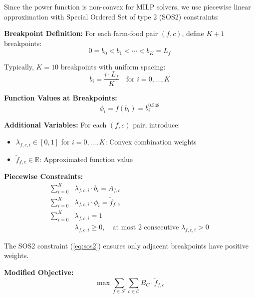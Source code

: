 \documentclass{article}
\begin{document}
Since the power function is non-convex for MILP solvers, we use piecewise linear approximation with Special Ordered Set of type 2 (SOS2) constraints:

\textbf{Breakpoint Definition:}
For each farm-food pair $(f,c)$, define $K+1$ breakpoints:
\begin{equation}
0 = b_0 < b_1 < \cdots < b_K = L_f
\end{equation}

Typically, $K = 10$ breakpoints with uniform spacing:
\begin{equation}
b_i = \frac{i \cdot L_f}{K} \quad \text{for } i = 0, \ldots, K
\end{equation}

\textbf{Function Values at Breakpoints:}
\begin{equation}
\phi_i = f(b_i) = b_i^{0.548}
\end{equation}

\textbf{Additional Variables:}
For each $(f,c)$ pair, introduce:
\begin{itemize}
    \item $\lambda_{f,c,i} \in [0,1]$ for $i = 0,\ldots,K$: Convex combination weights
    \item $\tilde{f}_{f,c} \in \mathbb{R}$: Approximated function value
\end{itemize}

\textbf{Piecewise Constraints:}
\begin{align}
 \sum_{i=0}^{K} &\lambda_{f,c,i} \cdot b_i =A_{f,c}\label{eq:pw_area}\\
 \sum_{i=0}^{K} &\lambda_{f,c,i} \cdot \phi_i =\tilde{f}_{f,c}\label{eq:pw_func}\\
\sum_{i=0}^{K} &\lambda_{f,c,i} = 1 \label{eq:pw_convex}\\
&\lambda_{f,c,i} \geq 0, \quad \text{at most 2 consecutive } \lambda_{f,c,i} > 0 \label{eq:sos2}
\end{align}

The SOS2 constraint (\ref{eq:sos2}) ensures only adjacent breakpoints have positive weights.


\textbf{Modified Objective:}
\begin{equation}
\max \sum_{f \in \mathcal{F}} \sum_{c \in \mathcal{C}} B_C \cdot \tilde{f}_{f,c}
\label{eq:pw_obj}
\end{equation}
\end{document}
